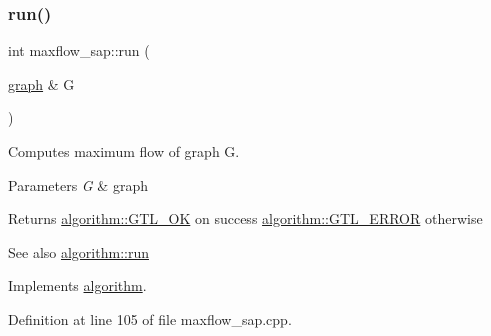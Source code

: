 \subsubsection{\texorpdfstring{run()}{run()}}
{\footnotesize\ttfamily int maxflow\+\_\+sap\+::run (\begin{DoxyParamCaption}\item[{\mbox{\hyperlink{classgraph}{graph}} \&}]{G }\end{DoxyParamCaption})\hspace{0.3cm}{\ttfamily [virtual]}}

Computes maximum flow of graph {\ttfamily G}.


\begin{DoxyParams}{Parameters}
{\em G} & graph \\
\hline
\end{DoxyParams}
\begin{DoxyReturn}{Returns}
{\ttfamily \mbox{\hyperlink{classalgorithm_af1a0078e153aa99c24f9bdf0d97f6710a5114c20e4a96a76b5de9f28bf15e282b}{algorithm\+::\+G\+T\+L\+\_\+\+OK}}} on success {\ttfamily \mbox{\hyperlink{classalgorithm_af1a0078e153aa99c24f9bdf0d97f6710a6fcf574690bbd6cf710837a169510dd7}{algorithm\+::\+G\+T\+L\+\_\+\+E\+R\+R\+OR}}} otherwise 
\end{DoxyReturn}
\begin{DoxySeeAlso}{See also}
\mbox{\hyperlink{classalgorithm_a734b189509a8d6b56b65f8ff772d43ca}{algorithm\+::run}} 
\end{DoxySeeAlso}


Implements \mbox{\hyperlink{classalgorithm_a734b189509a8d6b56b65f8ff772d43ca}{algorithm}}.



Definition at line 105 of file maxflow\+\_\+sap.\+cpp.


